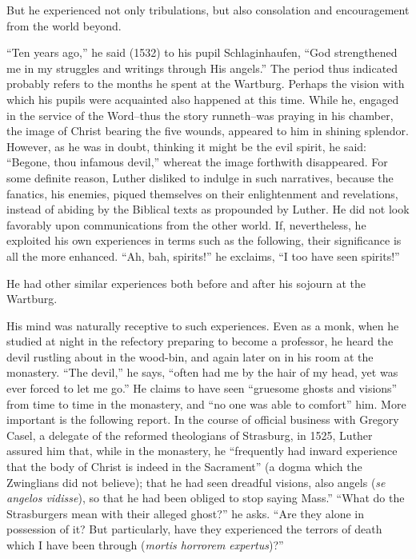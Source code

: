 But he experienced not only tribulations, but also consolation and
encouragement from the world beyond.

“Ten years ago,” he said (1532) to his pupil Schlaginhaufen, “God
strengthened me in my struggles and writings through His angels.”
The period thus indicated probably refers to the months he spent
at the Wartburg. Perhaps the vision with which his pupils were acquainted
also happened at this time. While he, engaged in the service
of the Word--thus the story runneth--was praying in his chamber,
the image of Christ bearing the five wounds, appeared to him in shining
splendor. However, as he was in doubt, thinking it might be the
evil spirit, he said: “Begone, thou infamous devil,” whereat the image
forthwith disappeared. For some definite reason, Luther disliked to
indulge in such narratives, because the fanatics, his enemies, piqued
themselves on their enlightenment and revelations, instead of abiding
by the Biblical texts as propounded by Luther. He did not look
favorably upon communications from the other world. If, nevertheless, he
exploited his own experiences in terms such as the following,
their significance is all the more enhanced. “Ah, bah, spirits!”
he exclaims, “I too have seen spirits!”

He had other similar experiences both before and after his sojourn
at the Wartburg.

His mind was naturally receptive to such experiences. Even as a
monk, when he studied at night in the refectory preparing to become
a professor, he heard the devil rustling about in the wood-bin, and
again later on in his room at the monastery. “The devil,” he says,
“often had me by the hair of my head, yet was ever forced to let
me go.” He claims to have seen “gruesome ghosts and visions” from
time to time in the monastery, and ``no one was able to comfort'' him.
More important is the following report. In the course of official business
with Gregory Casel, a delegate of the reformed theologians of
Strasburg, in 1525, Luther assured him that, while in the monastery,
he “frequently had inward experience that the body of Christ is indeed
in the Sacrament” (a dogma which the Zwinglians did not believe); that
he had seen dreadful visions, also angels (\textit{se angelos vidisse}),
so that he had been obliged to stop saying Mass.” “What do
the Strasburgers mean with their alleged ghost?” he asks. “Are they
alone in possession of it? But particularly, have they experienced the
terrors of death which I have been through (\textit{mortis horrorem expertus})?”

